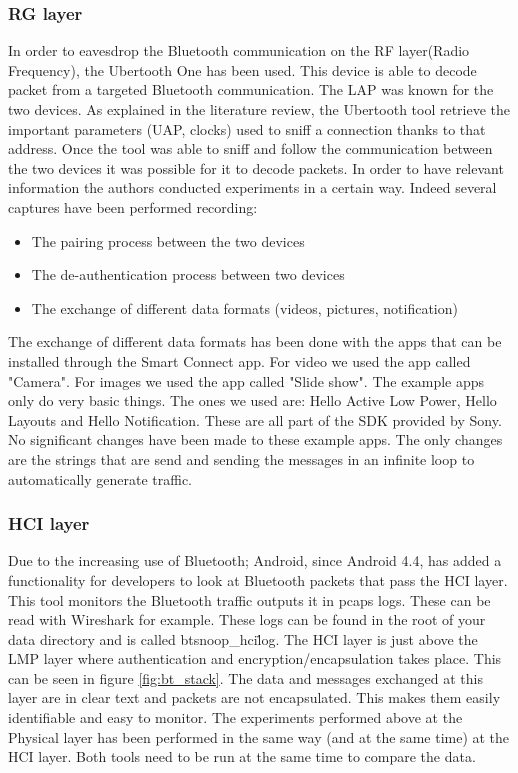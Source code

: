 \subsubsection{RG layer}
In order to eavesdrop the Bluetooth communication on the RF layer(Radio Frequency), the Ubertooth One has been used. This device is able to decode packet from a targeted Bluetooth communication. \pend
The LAP was known for the two devices. As explained in the literature review, the Ubertooth tool retrieve the important parameters (UAP, clocks) used to sniff a connection thanks to that address. Once the tool was able to sniff and follow the communication between the two devices it was possible for it to decode packets.
In order to have relevant information the authors conducted experiments in a certain way. Indeed several captures have been performed recording:
\begin{itemize}
	\item The pairing process between the two devices
	\item The de-authentication process between two devices
	\item The exchange of different data formats (videos, pictures, notification) 
\end{itemize}
The exchange of different data formats has been done with the apps that can be installed through the Smart Connect app. For video we used the app called "Camera". For images we used the app called "Slide show". \pend The example apps only do very basic things. The ones we used are: Hello Active Low Power, Hello Layouts and Hello Notification. These are all part of the SDK provided by Sony.
No significant changes have been made to these example apps. The only changes are the strings that are send and sending the messages in an infinite loop to automatically generate traffic.

\subsubsection{HCI layer}
Due to the increasing use of Bluetooth; Android, since Android 4.4, has added a functionality for developers to look at Bluetooth packets that pass the HCI layer. This tool monitors the Bluetooth traffic outputs it in pcaps logs. These can be read with Wireshark for example. These logs can be found in the root of your data directory and is called btsnoop\_hci\.log.\pend
The HCI layer is just above the LMP layer where authentication and encryption/encapsulation takes place. This can be seen in figure \ref{fig:bt_stack}. The data and messages exchanged at this layer are in clear text and packets are not encapsulated. This makes them easily identifiable and easy to monitor. \pend
The experiments performed above at the Physical layer has been performed in the same way (and at the same time) at the HCI layer. Both tools need to be run at the same time to compare the data.